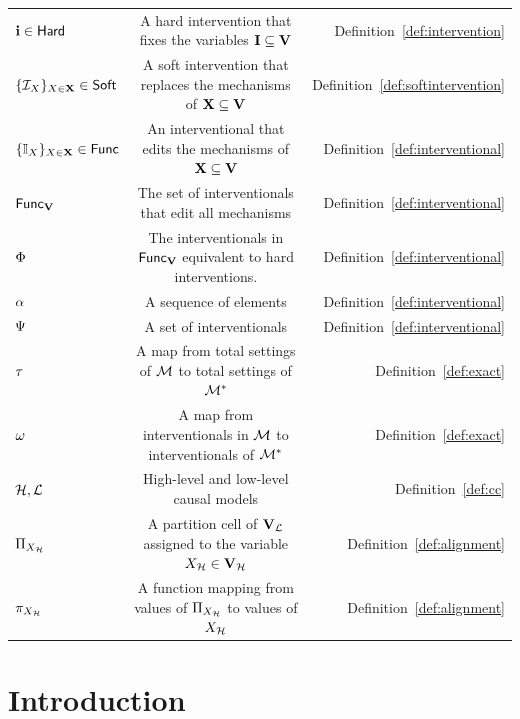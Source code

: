 \documentclass[twoside,11pt]{article}
\begin{document}
\begin{center}
{{\begin{tabular}{l c r}
     $\mathbf{i} \in \mathsf{Hard}$ & A hard intervention that fixes the variables $\mathbf{I} \subseteq \mathbf{V}$ & Definition~\ref{def:intervention}\\
     $\{\mathcal{I}_{X}\}_{X \in \mathbf{X}} \in \mathsf{Soft}$ & A soft intervention that replaces the mechanisms of $\mathbf{X}\subseteq \mathbf{V}$  & Definition~\ref{def:softintervention}\\
     $\{\mathbb{I}_{X}\}_{X \in \mathbf{X}} \in \mathsf{Func}$ & An interventional that edits the mechanisms of $\mathbf{X} \subseteq \mathbf{V}$ & Definition~\ref{def:interventional}\\
     $\mathsf{Func}_{\mathbf{V}}$ & The set of interventionals that edit all mechanisms & Definition~\ref{def:interventional}\\
     $\Phi$  & The interventionals in $\mathsf{Func}_{\mathbf{V}}$ equivalent to hard interventions.  & Definition~\ref{def:interventional}\\
     $\alpha$  & A sequence of elements & Definition~\ref{def:interventional}\\
     $\Psi$  & A set of interventionals & Definition~\ref{def:interventional}\\
     $\tau$  & A map from total settings of $\mathcal{M}$ to total settings of $\mathcal{M}^*$ & Definition~\ref{def:exact}\\
     $\omega$  & A map from interventionals in $\mathcal{M}$ to interventionals of $\mathcal{M}^*$ & Definition~\ref{def:exact}\\
     $\mathcal{H}, \mathcal{L}$ & High-level and low-level causal models & Definition~\ref{def:cc}\\ 
     $\Pi_{X_{\mathcal{H}}}$  & A partition cell of $\mathbf{V}_{\mathcal{L}}$ assigned to the variable $X_{\mathcal{H}} \in \mathbf{V}_{\mathcal{H}}$ & Definition~\ref{def:alignment}\\
     $\pi_{X_{\mathcal{H}}}$  & A function mapping from values of $\Pi_{X_{\mathcal{H}}}$ to values of $X_{\mathcal{H}}$ & Definition~\ref{def:alignment}\\
      \bottomrule
\end{tabular}
}
}
\end{center}

\newpage

\newpage
\section{Introduction}
\end{document}

